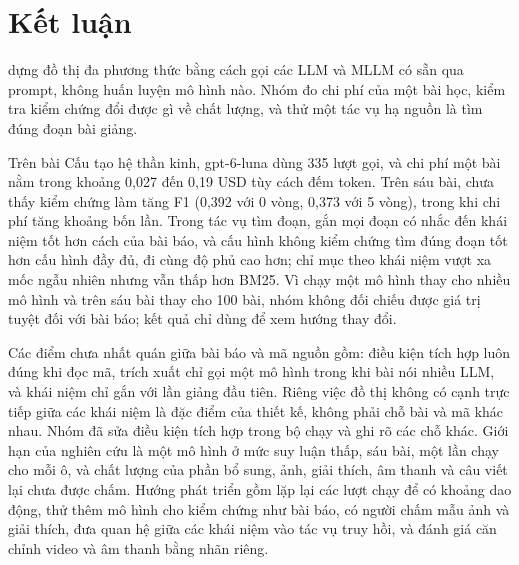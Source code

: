 \section{Kết luận}\label{sec:sm-conclusion}
\SM{} dựng đồ thị đa phương thức bằng cách gọi các LLM và MLLM có sẵn qua prompt, không huấn luyện mô hình nào.
Nhóm đo chi phí của một bài học, kiểm tra kiểm chứng đổi được gì về chất lượng, và thử một tác vụ hạ nguồn là tìm đúng đoạn bài giảng.

Trên bài Cấu tạo hệ thần kinh, gpt-6-luna dùng 335 lượt gọi, và chi phí một bài nằm trong khoảng 0,027 đến 0,19 USD tùy cách đếm token.
Trên sáu bài, chưa thấy kiểm chứng làm tăng F1 (0,392 với 0 vòng, 0,373 với 5 vòng), trong khi chi phí tăng khoảng bốn lần.
Trong tác vụ tìm đoạn, gắn mọi đoạn có nhắc đến khái niệm tốt hơn cách của bài báo, và cấu hình không kiểm chứng tìm đúng đoạn tốt hơn cấu hình đầy đủ, đi cùng độ phủ cao hơn; chỉ mục theo khái niệm vượt xa mốc ngẫu nhiên nhưng vẫn thấp hơn BM25.
Vì chạy một mô hình thay cho nhiều mô hình và trên sáu bài thay cho 100 bài, nhóm không đối chiếu được giá trị tuyệt đối với bài báo; kết quả chỉ dùng để xem hướng thay đổi.

Các điểm chưa nhất quán giữa bài báo và mã nguồn gồm: điều kiện tích hợp luôn đúng khi đọc mã, trích xuất chỉ gọi một mô hình trong khi bài nói nhiều LLM, và khái niệm chỉ gắn với lần giảng đầu tiên.
Riêng việc đồ thị không có cạnh trực tiếp giữa các khái niệm là đặc điểm của thiết kế, không phải chỗ bài và mã khác nhau.
Nhóm đã sửa điều kiện tích hợp trong bộ chạy và ghi rõ các chỗ khác.
Giới hạn của nghiên cứu là một mô hình ở mức suy luận thấp, sáu bài, một lần chạy cho mỗi ô, và chất lượng của phần bổ sung, ảnh, giải thích, âm thanh và câu viết lại chưa được chấm.
Hướng phát triển gồm lặp lại các lượt chạy để có khoảng dao động, thử thêm mô hình cho kiểm chứng như bài báo, có người chấm mẫu ảnh và giải thích, đưa quan hệ giữa các khái niệm vào tác vụ truy hồi, và đánh giá căn chỉnh video và âm thanh bằng nhãn riêng.
